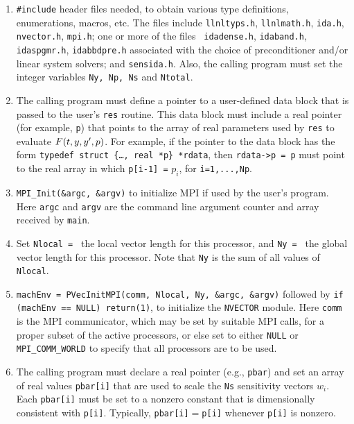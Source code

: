 \begin{enumerate}

\item {\tt \#include} header files needed, to obtain various type
definitions, enumerations, macros, etc.  
The files include {\tt llnltyps.h}, {\tt llnlmath.h}, {\tt ida.h},
{\tt nvector.h}, {\tt mpi.h}; one or more of the files {\tt
idadense.h}, {\tt idaband.h}, {\tt idaspgmr.h}, {\tt idabbdpre.h}
associated with the choice of preconditioner and/or linear system
solvers; and {\tt sensida.h}.
Also, the calling program must set the integer variables {\tt Ny, Np,
Ns} and {\tt Ntotal}.

\item The calling program must define a pointer to a user-defined data
block that is passed to the user's {\tt res} routine. 
This data block must include a real pointer (for example, {\tt p})
that points to the array of real parameters used by {\tt res} to
evaluate $F(t,y,y^{\prime},p)$. 
For example, if the pointer to the data block has the form 
\newline
{\tt typedef struct \{\ldots, real *p\} *rdata}, then {\tt rdata->p = p}
must point to the real array in which {\tt p[i-1] =} $p_i$, for
{\tt i=1,...,Np}.

\item {\tt MPI\_Init(\&argc, \&argv)} to initialize MPI if used by
the user's program.  Here {\tt argc} and {\tt argv} are the command
line argument counter and array received by {\tt main}.

\item Set {\tt Nlocal = } the local vector length
for this processor, and
{\tt Ny = } the global vector length for this processor.
Note that {\tt Ny} is the sum of all values of {\tt Nlocal}.

\item {\tt machEnv = PVecInitMPI(comm, Nlocal, Ny, \&argc, \&argv)}
followed by \newline
{\tt if (machEnv == NULL) return(1)}, to initialize the 
{\tt NVECTOR} module.  Here {\tt comm} is the MPI communicator, which
may be set by suitable MPI calls, for a proper subset of the active
processors, or else set to either {\tt NULL} or 
{\tt MPI\_COMM\_WORLD} to specify that all processors are to be used.

\item
The calling program must declare a real pointer (e.g., {\tt pbar}) and
set an array of real values {\tt pbar[i]} that are used to scale the
{\tt Ns} sensitivity vectors $w_i$.
Each {\tt pbar[i]} must be set to a nonzero constant that is
dimensionally consistent with {\tt p[i]}.
Typically, {\tt pbar[i]}$=${\tt p[i]} whenever {\tt p[i]} is nonzero.


\end{enumerate}

